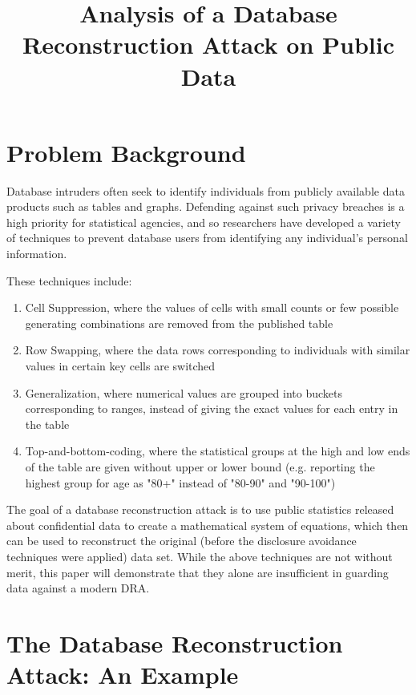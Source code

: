 \documentclass[jou,apacite]{apa6}
\title{Analysis of a Database Reconstruction Attack on Public Data}
\begin{document}
\maketitle

\section{Problem Background}
Database intruders often seek to identify individuals from publicly
available data products such as tables and graphs.
Defending against such privacy breaches is
a high priority for statistical agencies, and so researchers
have developed a variety of techniques to prevent database users
from identifying any individual's personal information.

These techniques include:
\begin{enumerate}
  \item Cell Suppression, where the values of cells with small counts or few possible
        generating combinations are removed from the published table
  \item Row Swapping, where the data rows corresponding to individuals
        with similar values in certain key cells are switched
  \item Generalization, where numerical values are grouped into
        buckets corresponding to ranges, instead of giving the exact
        values for each entry in the table
  \item Top-and-bottom-coding, where the statistical groups at the high and low ends
        of the table are given without upper or lower bound (e.g.
        reporting the highest group for age as "80+" instead of
        "80-90" and "90-100")
\end{enumerate}

The goal of a database reconstruction attack is to
use public statistics released about confidential data to create a mathematical system of equations,
which then can be used to reconstruct the original (before the disclosure
avoidance techniques were applied) data set.
While the above techniques are not without merit, this paper will
demonstrate that they alone are insufficient in guarding data against
a modern DRA.

\section{The Database Reconstruction Attack: An Example}
\end{document}

